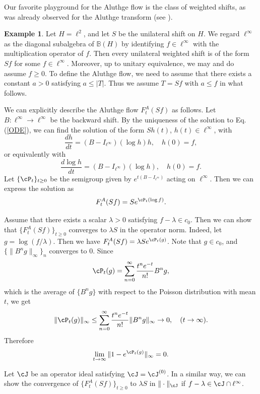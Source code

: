 \documentclass[12pt]{article}
\theoremstyle{definition}
\newtheorem{example}[theorem]{Example}
\numberwithin{equation}{section}
\newcommand{\B}{\mathbb{B}}
\begin{document}
Our favorite playground for the Aluthge flow is the class of weighted shifts,   
as was already observed for the Aluthge transform (see \cite{CJL2005}). 

\begin{example} Let $H=\ell^2$, and let $S$ be the unilateral shift on $H$. 
We regard $\ell^\infty$ as the diagonal subalgebra of $\B(H)$ by identifying $f\in \ell^\infty$ with the 
multiplication operator of $f$. 
Then every unilateral weighted shift is of the form $Sf$ for some $f\in \ell^\infty$. 
Moreover, up to unitary equivalence, we may and do assume $f\geq 0$.  
To define the Aluthge flow, we need to assume that there exists a constant $a>0$ satisfying $a\leq |T|$. 
Thus we assume $T=Sf$ with $a\leq f$ in what follows. 

We can explicitly describe the Aluthge flow $F^A_t(Sf)$ as follows. 
Let $B:\ell^\infty\to\ell^\infty$ be the backward shift. 
By the uniqueness of the solution to Eq.(\ref{ODE}), we can find the solution of the form $Sh(t)$, $h(t)\in \ell^\infty$, with 
\[\frac{dh}{dt}=(B-I_{\ell^\infty})(\log h)h,\quad h(0)=f,\]
or equivalently with 
\[\frac{d\log h}{dt}=(B-I_{\ell^\infty})(\log h),\quad h(0)=f.\]
Let $\{\cP_t\}_{t\geq 0}$ be
the semigroup given by $e^{t(B-I_{\ell^\infty})}$ acting on $\ell^\infty$. 
Then we can express the solution as  
\begin{equation}\label{Poisson}
F^A_t(Sf)=Se^{\cP_t(\log f)}.
\end{equation}

Assume that there exists a scalar $\lambda>0$ satisfying $f-\lambda\in c_0$. 
Then we can show that $\{F^A_t(Sf)\}_{t\geq 0}$ converges to $\lambda S$ in the operator norm. 
Indeed, let $g=\log (f/\lambda)$. 
Then we have $F^A_t(Sf)=\lambda Se^{\cP_t(g)}$.  
Note that $g\in c_0$, and $\{\|B^{n}g\|_\infty\}_n$ converges to 0. 
Since 
\[\cP_t(g)=\sum_{n=0}^\infty \frac{t^ne^{-t}}{n!}B^{n}g,\] 
which is the average of $\{B^ng\}$ with respect to the Poisson distribution with mean $t$, we get 
\[\|\cP_t(g)\|_\infty\leq \sum_{n=0}^\infty \frac{t^ne^{-t}}{n!}\|B^{n}g\|_\infty \to 0, \quad (t\to\infty).\]
Therefore 
\[\lim_{t\to \infty}\|1-e^{\cP_t(g)}\|_\infty=0.\]

Let $\cJ$ be an operator ideal satisfying $\cJ=\cJ^{(0)}$. 
In a similar way, we can show  the convergence of $\{F^A_t(Sf)\}_{t\geq 0}$ to $\lambda S$ in $\|\cdot\|_\cJ$ 
if $f-\lambda\in \cJ\cap \ell^\infty$.  
\end{example}
\end{document}
